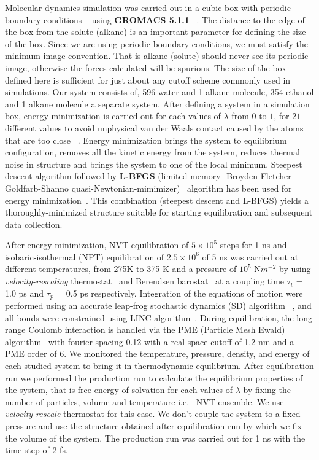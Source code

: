    Molecular dynamics simulation was carried out in a cubic box  with periodic boundary conditions ~\citep{Allen1989} using \textbf{GROMACS 5.1.1} ~\citep{van2005gromacs, hess2008gromacs}. The distance to the edge of the box from the solute (alkane) is an important parameter for defining the size of the box. Since we are  using periodic boundary conditions, we must satisfy the minimum image convention. That is alkane (solute) should never see its periodic image, otherwise the forces calculated will be spurious. The size of the box defined here  is sufficient for just about any cutoff scheme commonly used in simulations. Our system consists of,  596 water and 1 alkane molecule,  354 ethanol and 1 alkane molecule a separate system. After defining a system in a simulation box, energy minimization is carried out for each values of $\lambda$ from $0$ to $1$, for $21$ different values to avoid unphysical van der Waals contact caused by the atoms that are too close ~\citep{Gromacs-manual}. Energy minimization brings the system to equilibrium configuration, removes all
the kinetic energy from the system, reduces thermal noise in structure and brings the system to one of the local minimum. Steepest descent algorithm followed by \textbf{L-BFGS} (limited-memory- Broyden-Fletcher-Goldfarb-Shanno quasi-Newtonian-mimimizer)~\citep{byrd1995limited, zhu1997algorithm} algorithm  has been used for energy minimization~\citep{Gromacs-manual}. This combination (steepest descent and L-BFGS) yields a thoroughly-minimized structure suitable for starting equilibration and subsequent data collection. 

 After energy minimization,  NVT equilibration of $5\times 10^5$ steps for 1 ns  and  isobaric-isothermal (NPT) equilibration  of $2.5\times 10^6$ of 5 ns  was carried out at different temperatures, from 275K to 375 K and a pressure of $10^5$ N$m^{-2}$ by using \emph{velocity-rescaling} thermostat~\citep{bussi2007canonical} and Berendsen barostat~\citep{Berendsen1984} at a coupling time $\tau_t$ = 1.0 ps and $\tau_p$ = 0.5 ps respectively. Integration of the equations of motion were performed using an accurate leap-frog  stochastic dynamics (SD)  algorithm ~\citep{van1988leap},  and all bonds were constrained using LINC algorithm~\citep{hess1997lincs}. During equilibration, the long range Coulomb interaction is handled via the PME (Particle Mesh Ewald) algorithm~ \citep{darden1993particle, essmann1995smooth} with fourier spacing 0.12 with a real space cutoff of 1.2 nm and a PME order of 6.  We monitored the temperature, pressure, density, and energy of each studied system to bring it in  thermodynamic equilibrium.  After equilibration run we performed the production run to calculate the equilibrium properties of the system, that is free energy of solvation for each values of $\lambda$  by fixing the number of particles, volume and temperature i.e.~ NVT ensemble. We use \emph{velocity-rescale} thermostat for this case. We don't couple the system to a fixed pressure and use the structure obtained after equilibration run by which we fix the volume of the system. The production run was carried out for 1 ns with the time step of 2 fs.
 


